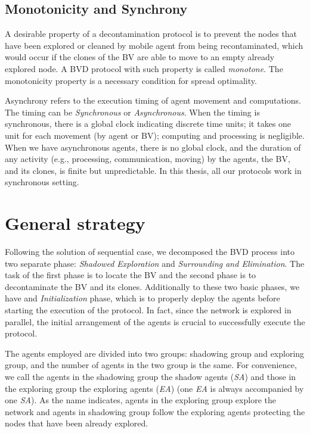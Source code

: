 \subsection{Monotonicity and  Synchrony}
A desirable property of a decontamination protocol is to prevent the nodes that have  been explored or cleaned by mobile agent from being recontaminated,  which would occur if the clones of the BV are able to move to an empty  already  explored node. A BVD protocol with such property is called {\em monotone}. The monotonicity   property is a necessary condition for spread optimality.

Asynchrony refers to the execution timing of agent movement and computations. The timing can be {\em Synchronous} or {\em Asynchronous}. When the timing is synchronous, there is a global clock indicating discrete time units; it takes one unit for each movement (by agent or BV); computing and processing is negligible. When we have asynchronous agents, there is no global clock, and the duration of any activity (e.g., processing, communication, moving) by the agents, the BV, and its clones, is finite but unpredictable. In this thesis, all our protocols work in synchronous setting.

\section{ General strategy}
Following the solution of  sequential case, we decomposed the BVD process into two separate phase: {\em Shadowed Exploration} and {\em Surrounding and Elimination}. The task of the first phase is to locate the BV and the second phase is to decontaminate the BV and its clones.  Additionally to   these two basic phases, we have and  {\em Initialization} phase, which is to properly deploy the agents  before starting the  execution of the protocol. In fact, since the network is explored in parallel,  the initial  arrangement of the agents is crucial to successfully execute the protocol. 

  The agents employed are divided into two groups: shadowing group and exploring group, and the number of agents in  the two group is the same. For convenience, we call the agents in the shadowing group the shadow agents ({\em SA}) and those in the exploring group the exploring agents ({\em EA}) (one {\em EA} is always accompanied by one {\em SA}). As the name indicates, agents in the exploring group explore the network and   agents in shadowing group follow the exploring agents  protecting the nodes that  have been already explored. 

